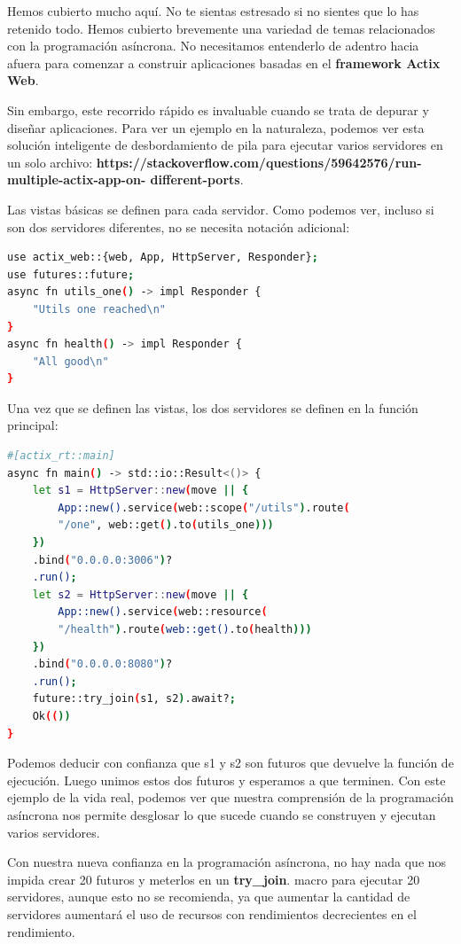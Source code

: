 Hemos cubierto mucho aquí. No te sientas estresado si no sientes que lo has retenido todo. Hemos cubierto brevemente una variedad de temas relacionados con la programación asíncrona. No necesitamos entenderlo de adentro hacia afuera para comenzar a construir aplicaciones basadas en el \textbf{framework Actix Web}.

Sin embargo, este recorrido rápido es invaluable cuando se trata de depurar y diseñar aplicaciones. Para ver un ejemplo en la naturaleza, podemos ver esta solución inteligente de desbordamiento de pila para ejecutar varios servidores en un solo archivo: \textbf{https://stackoverflow.com/questions/59642576/run-multiple-actix-app-on- different-ports}.

Las vistas básicas se definen para cada servidor. Como podemos ver, incluso si son dos servidores diferentes, no se necesita notación adicional:

\begin{lstlisting}[language=bash]
use actix_web::{web, App, HttpServer, Responder};
use futures::future;
async fn utils_one() -> impl Responder {
	"Utils one reached\n"	
}
async fn health() -> impl Responder {
	"All good\n"	
}
\end{lstlisting}

Una vez que se definen las vistas, los dos servidores se definen en la función principal:

\begin{lstlisting}[language=bash]
#[actix_rt::main]
async fn main() -> std::io::Result<()> {
	let s1 = HttpServer::new(move || {
		App::new().service(web::scope("/utils").route(
		"/one", web::get().to(utils_one)))	
	})
	.bind("0.0.0.0:3006")?
	.run();
	let s2 = HttpServer::new(move || {
		App::new().service(web::resource(
		"/health").route(web::get().to(health)))	
	})
	.bind("0.0.0.0:8080")?
	.run();
	future::try_join(s1, s2).await?;	
	Ok(())	
}
\end{lstlisting}

Podemos deducir con confianza que s1 y s2 son futuros que devuelve la función de ejecución. Luego unimos estos dos futuros y esperamos a que terminen. Con este ejemplo de la vida real, podemos ver que nuestra comprensión de la programación asíncrona nos permite desglosar lo que sucede cuando se construyen y ejecutan varios servidores.

Con nuestra nueva confianza en la programación asíncrona, no hay nada que nos impida crear 20 futuros y meterlos en un \textbf{try\_join}. macro para ejecutar 20 servidores, aunque esto no se recomienda, ya que aumentar la cantidad de servidores aumentará el uso de recursos con rendimientos decrecientes en el rendimiento.


